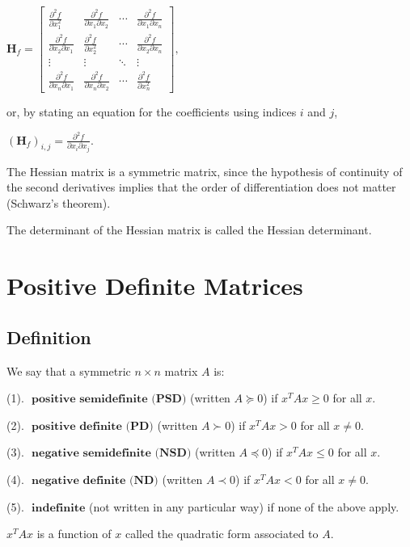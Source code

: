 \documentclass[11pt]{elegantbook}
\begin{document}
$
\mathbf{H}_{f}=\left[\begin{array}{cccc}
\frac{\partial^{2} f}{\partial x_{1}^{2}} & \frac{\partial^{2} f}{\partial x_{1} \partial x_{2}} & \cdots & \frac{\partial^{2} f}{\partial x_{1} \partial x_{n}} \\
\frac{\partial^{2} f}{\partial x_{2} \partial x_{1}} & \frac{\partial^{2} f}{\partial x_{2}^{2}} & \cdots & \frac{\partial^{2} f}{\partial x_{2} \partial x_{n}} \\
\vdots & \vdots & \ddots & \vdots \\
\frac{\partial^{2} f}{\partial x_{n} \partial x_{1}} & \frac{\partial^{2} f}{\partial x_{n} \partial x_{2}} & \cdots & \frac{\partial^{2} f}{\partial x_{n}^{2}}
\end{array}\right],
$

or, by stating an equation for the coefficients using indices $i$ and $j$,

$
\left(\mathbf{H}_{f}\right)_{i, j}=\frac{\partial^{2} f}{\partial x_{i} \partial x_{j}}.
$

The Hessian matrix is a symmetric matrix, since the hypothesis of continuity of the second derivatives implies that the order of differentiation does not matter (Schwarz's theorem).

The determinant of the Hessian matrix is called the Hessian determinant.

\section{Positive Definite Matrices}
\subsection{Definition}
We say that a symmetric $n \times n$ matrix $A$ is:

(1). $\textbf{ positive semidefinite (PSD)}$ (written $A \succeq 0$) if $x^TAx \geq 0$ for all $x$.

(2). $\textbf{ positive definite (PD)}$ (written $A \succ 0$) if $x^TAx > 0$ for all $x\neq 0$.

(3). $\textbf{ negative semidefinite (NSD)}$ (written $A \preceq 0$) if $x^TAx \leq 0$ for all $x$.

(4). $\textbf{ negative definite (ND)}$ (written $A \prec 0$) if $x^TAx < 0$ for all $x\neq 0$.

(5). $\textbf{ indefinite}$ (not written in any particular way) if none of the above apply.

$x^TAx$ is a function of $x$ called the quadratic form associated to $A$.
\end{document}
